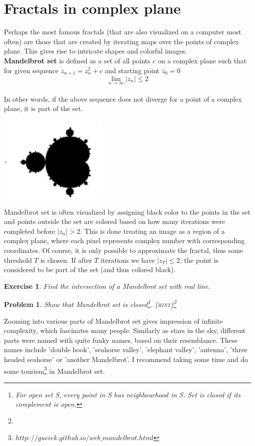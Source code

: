 \documentclass[12pt]{article}
\newtheorem{exercise}{Exercise}
\newtheorem{problem}{Problem}
\begin{document}
\section{Fractals in complex plane}
Perhaps the most famous fractals (that are also visualized on a computer most often) are those that are created by iterating maps over the points of complex plane. This gives rise to intricate shapes and colorful images.\\

\noindent \textbf{Mandelbrot set} is defined as a set of all points $c$ on a complex plane such that for given sequence $z_{n+1} = z_{n}^{2} + c$ and starting point $z_0 = 0$  
\[\lim_{n \to \infty} |z_n| \le 2\] \\
In other words, if the above sequence does not diverge for a point of a complex plane, it is part of the set. \\ 
\centerline{\includegraphics[width = 200px]{mandel}}
Mandelbrot set is often visualized by assigning black color to the points in the set and points outside the set are colored based on how many iterations were completed before $|z_n| > 2$. This is done treating an image as a region of a complex plane, where each pixel represents complex number with corresponding coordinates. Of course, it is only possible to approximate the fractal, thus some threshold $T$ is chosen. If after $T$ iterations we have $|z_T| \le 2$, the point is considered to be part of the set (and thus colored black).
\begin{exercise}
Find the intersection of a Mandelbrot set with real line.
\end{exercise}
\begin{problem}
Show that Mandelbrot set is closed\footnote{For open set S, every point in S has neighbourhood in S. Set is closed if its complement is open.}. \textsc{(hint)}\footnote{}
\end{problem}
\noindent Zooming into various parts of Mandelbrot set gives impression of infinite complexity, which fascinates many people. Similarly as stars in the sky, different parts were named with quite funky names, based on their resemblance. These names include 'double hook', 'seahorse valley', 'elephant valley', 'antenna', 'three headed seahorse' or 'another Mandelbrot'. I recommend taking some time and do some tourism\footnote{$http://guciek.github.io/web\_mandelbrot.html$} in Mandelbrot set.\\
\end{document}
